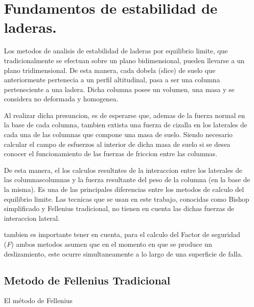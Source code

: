 \chapter{Fundamentos de estabilidad de laderas.}
Los metodos de analisis de estabilidad de laderas por equilibrio limite, que tradicionalmente se efectuan sobre un plano bidimensional, pueden llevarse a un plano tridimensional.
De esta manera, cada dobela (slice) de suelo  que anteriormente pertenecia a un perfil altitudinal, pasa a ser una columna perteneciente a una ladera. Dicha columna posee un volumen, una masa y se considera no deformada y homogenea.

Al realizar dicha presuncion, es de esperarse que, ademas de la fuerza normal en la base de cada columna, tambien extista una fuerza de cizalla en los laterales de cada una de las columnas que compone una masa de suelo. Siendo necesario calcular el campo de esfuerzos al interior de dicha masa de suelo si se desea conocer el funcionamiento de las fuerzas de friccion entre las columnas.

De esta manera, el los calculos resultntes de la interaccion entre los laterales de las columnascolumnas y la fuerza resultante del peso de la columna (en la base de la misma). Es una de las principales diferencias entre los metodos de calculo del equilibrio limite. Las tecnicas que se usan en este trabajo, conocidas como Bishop simplificado y Fellenius tradicional, no tienen en cuenta las dichas fuerzas de interaccion lateral.

tambien es importante tener en cuenta, para el calculo del Factor de seguridad (\textit{F}) ambos metodos asumen que en el momento en que se produce un deslizamiento, este ocurre simultaneamente a lo largo de una superficie de falla.

\section{Metodo de Fellenius Tradicional}
El método de Fellenius 

